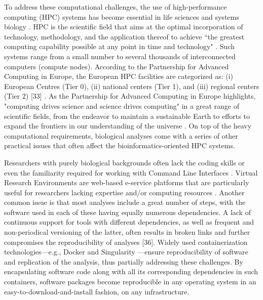    To address these computational challenges, the use of high-performance computing (HPC) systems 
   has become essential in life sciences and systems biology \citep{lampa2013lessons}. 
   HPC is the scientific field that aims at the optimal incorporation of technology, methodology, 
   and the application thereof to achieve “the greatest computing capability possible at any point 
   in time and technology" \citep{sterling2017high}. 
   Such systems range from a small number to several thousands of interconnected computers (compute nodes). 
   According to the Partnership for Advanced Computing in Europe, the European HPC facilities are categorized as: 
   (i) European Centres (Tier 0), 
   (ii) national centers (Tier 1), and 
   (iii) regional centers (Tier 2) [33] \citep{enwiki:1009652575}. 
   As the Partnership for Advanced Computing in Europe highlights, "computing drives science and science drives computing" 
   in a great range of scientific fields, from the endeavor to maintain a sustainable Earth to efforts to expand 
   the frontiers in our understanding of the universe \citep{lindahl2018scientific}. 
   On top of the heavy computational requirements, biological analyses come with a series of other practical issues 
   that often affect the bioinformatics-oriented HPC systems.

   Researchers with purely biological backgrounds often lack the coding skills or even the 
   familiarity required for working with Command Line Interfaces \citep{lindahl2018scientific}. 
   Virtual Research Environments are web-based e-service platforms that are particularly useful 
   for researchers lacking expertise and/or computing resources \citep{candela2013virtual}. 
   Another common issue is that most analyses include a great number of steps, with the software 
   used in each of these having equally numerous dependencies. A lack of continuous support 
   for tools with different dependencies, as well as frequent and non-periodical versioning of the latter, 
   often results in broken links and further compromises the reproducibility of analyses [36]. 
   Widely used containerization technologies—e.g., Docker \citep{rad2017introduction} and Singularity \citep{kurtzer2017singularity}—ensure reproducibility 
   of software and replication of the analysis, thus partially addressing these challenges. 
   By encapsulating software code along with all its corresponding dependencies in such containers, 
   software packages become reproducible in any operating system in an easy-to-download-and-install 
   fashion, on any infrastructure.

